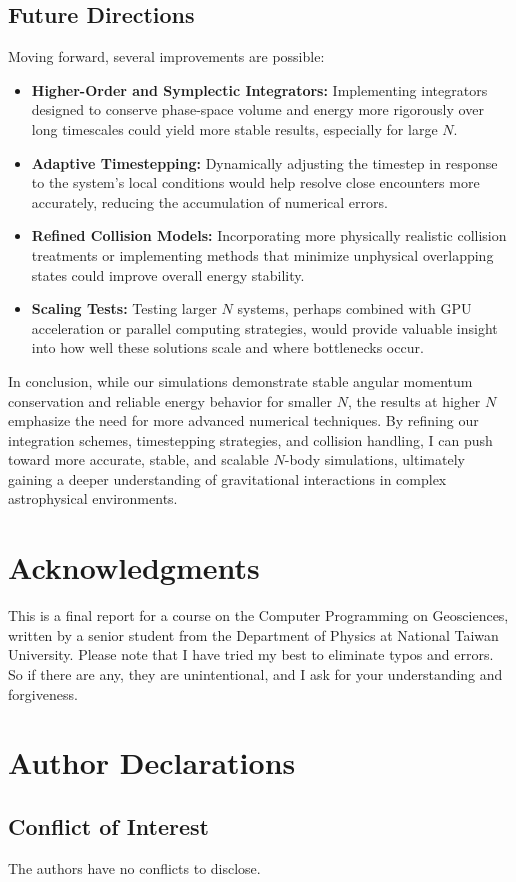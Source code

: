 \documentclass[a4paper, 12pt, oneside, onecolumn]{article}
\begin{document}
\begin{multicols}{2}
\subsection*{Future Directions}

Moving forward, several improvements are possible:

\begin{itemize}
    \item \textbf{Higher-Order and Symplectic Integrators:} Implementing integrators designed to conserve phase-space volume and energy more rigorously over long timescales could yield more stable results, especially for large $N$.
    \item \textbf{Adaptive Timestepping:} Dynamically adjusting the timestep in response to the system’s local conditions would help resolve close encounters more accurately, reducing the accumulation of numerical errors.
    \item \textbf{Refined Collision Models:} Incorporating more physically realistic collision treatments or implementing methods that minimize unphysical overlapping states could improve overall energy stability.
    \item \textbf{Scaling Tests:} Testing larger $N$ systems, perhaps combined with GPU acceleration or parallel computing strategies, would provide valuable insight into how well these solutions scale and where bottlenecks occur.
\end{itemize}

In conclusion, while our simulations demonstrate stable angular momentum conservation and reliable energy behavior for smaller $N$, the results at higher $N$ emphasize the need for more advanced numerical techniques. By refining our integration schemes, timestepping strategies, and collision handling, I can push toward more accurate, stable, and scalable $N$-body simulations, ultimately gaining a deeper understanding of gravitational interactions in complex astrophysical environments.








\end{multicols}


\section*{Acknowledgments}
This is a final report for a course on the Computer Programming on Geosciences, written by a senior student from the Department of Physics at National Taiwan University. Please note that I have tried my best to eliminate typos and errors. So if there are any, they are unintentional, and I ask for your understanding and forgiveness.
\section*{Author Declarations}
\subsection*{Conflict of Interest}
The authors have no conflicts to disclose.
\newpage
\nocite{*}


\end{document}
